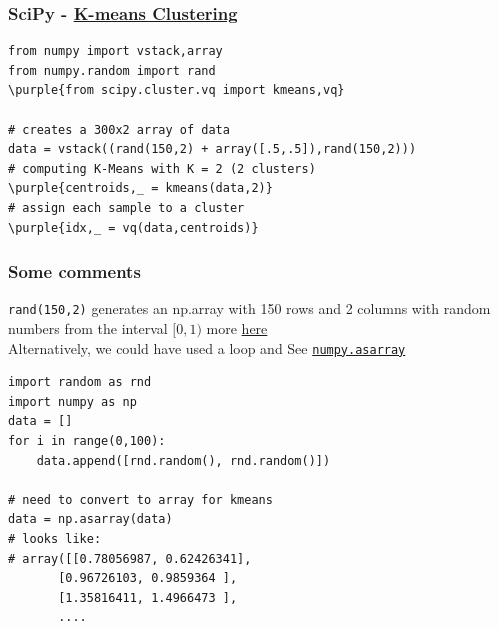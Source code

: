 \documentclass[xcolor=svgnames, handout]{beamer}
\newcommand{\purple}[1]{{\textcolor{purple}{#1}}}
\newcommand{\nl}{\\[1em]}
\newcommand{\ft}[1]{\frametitle{#1}}
\begin{document}
\begin{frame}[fragile]\ft{SciPy - \href{https://glowingpython.blogspot.com/2012/04/k-means-clustering-with-scipy.html}{K-means Clustering}}
\begin{Verbatim}[xleftmargin=.1in, commandchars=\\\{\}] 
from numpy import vstack,array
from numpy.random import rand
\purple{from scipy.cluster.vq import kmeans,vq}

# creates a 300x2 array of data
data = vstack((rand(150,2) + array([.5,.5]),rand(150,2)))
# computing K-Means with K = 2 (2 clusters)
\purple{centroids,_ = kmeans(data,2)}
# assign each sample to a cluster
\purple{idx,_ = vq(data,centroids)}
\end{Verbatim}
\end{frame}

\begin{frame}[fragile]\ft{Some comments}
{\tt rand(150,2)} generates an np.array with 150 rows and 2 columns with random numbers from the interval $[0,1)$ more \href{https://docs.scipy.org/doc/numpy-1.15.1/reference/generated/numpy.random.rand.html}{here}\nl

Alternatively, we could have used a loop and See \href{https://docs.scipy.org/doc/numpy/reference/generated/numpy.asarray.html}{{\tt numpy.asarray}}
\begin{Verbatim}[xleftmargin=0.2in, frame=single]
import random as rnd
import numpy as np
data = []
for i in range(0,100):
    data.append([rnd.random(), rnd.random()])

# need to convert to array for kmeans
data = np.asarray(data) 
# looks like:
# array([[0.78056987, 0.62426341],
       [0.96726103, 0.9859364 ],
       [1.35816411, 1.4966473 ],
       ....
\end{Verbatim}
\end{frame}
\end{document}
